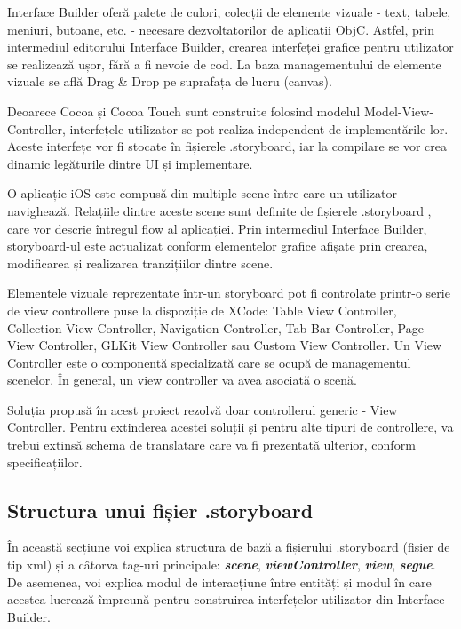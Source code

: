 Interface Builder oferă palete de culori, colecții de elemente vizuale - text, tabele, meniuri, butoane, etc. - necesare dezvoltatorilor de aplicații ObjC. Astfel, prin intermediul editorului Interface Builder, crearea interfeței grafice pentru utilizator se realizează ușor, fără a fi nevoie de cod. La baza managementului de elemente vizuale se află Drag \& Drop pe suprafața de lucru (canvas). 

Deoarece Cocoa și Cocoa Touch sunt construite folosind modelul Model-View-Controller, interfețele utilizator se pot realiza independent de implementările lor. Aceste interfețe vor fi stocate în fișierele .storyboard, iar la compilare se vor crea dinamic legăturile dintre UI și implementare.

O aplicație iOS este compusă din multiple scene între care un utilizator navighează. Relațiile dintre aceste scene sunt definite de fișierele .storyboard \cite{StructuraXcode}, care vor descrie întregul flow al aplicației. Prin intermediul Interface Builder, storyboard-ul este actualizat conform elementelor grafice afișate prin crearea, modificarea și realizarea tranzițiilor dintre scene.

Elementele vizuale reprezentate într-un storyboard pot fi controlate printr-o serie de view controllere puse la dispoziție de XCode: Table View Controller, Collection View Controller, Navigation Controller, Tab Bar Controller, Page View Controller, GLKit View Controller sau Custom View Controller. Un View Controller este o componentă specializată care se ocupă de managementul scenelor. În general, un view controller va avea asociată o scenă. 

Soluția propusă în acest proiect rezolvă doar controllerul generic - View Controller. Pentru extinderea acestei soluții și pentru alte tipuri de controllere, va trebui extinsă schema de translatare care va fi prezentată ulterior, conform specificațiilor. 

\subsection{Structura unui fișier .storyboard}

În această secțiune voi explica structura de bază a fișierului .storyboard (fișier de tip xml) și a câtorva tag-uri principale: \textbf{\textit{scene}}, \textbf{\textit{viewController}}, \textbf{\textit{view}}, \textbf{\textit{segue}}. De asemenea, voi explica modul de interacțiune între entități și modul în care acestea lucrează împreună pentru construirea interfețelor utilizator din Interface Builder.


